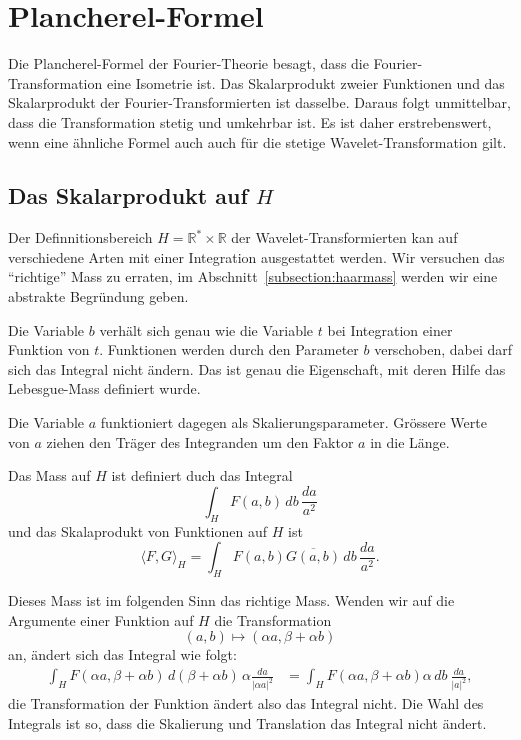 %
%
%
\section{Plancherel-Formel%
\label{section:cwt:plancherel}}
Die Plancherel-Formel der Fourier-Theorie besagt, dass die
Fourier-Transformation eine Isometrie ist.
Das Skalarprodukt zweier Funktionen und das Skalarprodukt der
Fourier-Transformierten ist dasselbe.
Daraus folgt unmittelbar, dass die Transformation stetig und
umkehrbar ist.
Es ist daher erstrebenswert, wenn eine ähnliche Formel auch
auch für die stetige Wavelet-Transformation gilt.

\subsection{Das Skalarprodukt auf $H$}
Der Definnitionsbereich $H=\mathbb R^* \times \mathbb R$ der
Wavelet-Transformierten kan auf verschiedene Arten mit einer Integration
ausgestattet werden.
Wir versuchen das ``richtige'' Mass zu erraten, im
Abschnitt~\ref{subsection:haarmass} werden wir eine abstrakte Begründung
geben.

Die Variable $b$ verhält sich genau wie die Variable $t$ bei Integration
einer Funktion von $t$.
Funktionen werden durch den Parameter $b$ verschoben, dabei darf sich
das Integral nicht ändern.
Das ist genau die Eigenschaft, mit deren Hilfe das Lebesgue-Mass
definiert wurde.

Die Variable $a$ funktioniert dagegen als Skalierungsparameter.
Grössere Werte von $a$ ziehen den Träger des Integranden um den Faktor $a$ 
in die Länge.

\begin{definition}
Das Mass auf $H$ ist definiert duch das Integral
\[
\int_H F(a,b)\,db \,\frac{da}{a^2}
\]
und das Skalaprodukt von Funktionen auf $H$ ist
\[
\langle F,G\rangle_H
=
\int_{H} F(a,b)\overline{G(a,b)}\,db \,\frac{da}{a^2}.
\]
\end{definition}

Dieses Mass ist im folgenden Sinn das richtige Mass.
Wenden wir auf die Argumente einer Funktion auf $H$ die Transformation
\[
(a,b) \mapsto (\alpha a, \beta + \alpha b)
\]
an, ändert sich das Integral wie folgt:
\begin{align*}
\int_H F(\alpha a,\beta + \alpha b)\,d(\beta + \alpha b)\,\alpha\frac{da}{|\alpha a|^2}
&=
\int_H F(\alpha a,\beta + \alpha b) \alpha\,db \ \frac{da}{|a|^2},
\end{align*}
die Transformation der Funktion ändert also das Integral nicht.
Die Wahl des Integrals ist so, dass die Skalierung und Translation
das Integral nicht ändert.

